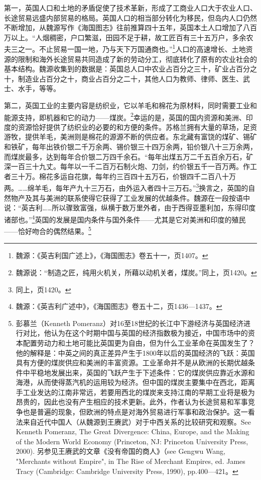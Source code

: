 \documentclass[a4paper, 12pt, openright]{ctexbook}
\begin{document}
第一，英国人口和土地的矛盾促使了技术革新，形成了工商业人口大于农业人口、长途贸易远盛内部贸易的格局。英国人口的相当部分转化为移民，但岛内人口仍然不断增加，从魏源写作《海国图志》往前推算四十五年，英国本土人口增加了八百万以上。“人烟稠密，户口繁滋，田园不足于耕，故工匠百有三十五万户，多余农夫三之一。不止贸易一国一地，乃与天下万国通商也。”\footnote{魏源：《英吉利国广述上》，《海国图志》卷五十一，页1407。}人口的高速增长、土地资源的限制和海外长途贸易共同造成了新的劳动分工，彻底转化了原有的农业社会的基本结构。魏源收集到的数据是：英国总人口中农业占百分之三十，矿业占百分之十，制造业占百分之十，商业占百分之二十，其他人口为教师、律师、医生、武士、水手，等等。

第二，英国工业的主要内容是纺织业，它以羊毛和棉花为原材料，同时需要工业和能源支持，即机器和它的动力——煤炭。\footnote{魏源说：“制造之匠，纯用火机关，所藉以动机关者，煤炭。”同上，页1420。}幸运的是，英国的国内资源和美洲、印度的资源恰好提供了纺织业的必要的和方便的条件。苏格兰拥有大量的草场，足资游牧，提供羊毛，美洲则是棉花的源源不断的供应者。东北藏有富饶的煤矿、锡矿和铁矿，每年出铁价银二千万余两、锡价银三十四万余两，铅价银八十三万余两，而煤炭最多，达到每年合价银二万四千余石。“每年出煤五万二千五百余万石，矿深一百三十九丈。每年以一千二百万石制火炮、刀剑，约价银五千一百万两。作工者三十万。棉花多运自花旗，每年约三百四十五万石，价银四千二百八十万两。……绵羊毛，每年产九十三万石，由外运入者四十三万石。”\footnote{同上，页1420。}换言之，英国的自然物产及其与美洲的联系使得它获得了工业发展的优越条件。魏源在一段按语中说：“英吉利……所以骤致富强，纵横于数万里外者，由于西得亚墨利加，东得印度诸部也。”\footnote{魏源：《英吉利广述中》，《海国图志》卷五十二，页1436—1437。}英国的发展是国内条件与国外条件——尤其是它对美洲和印度的殖民——恰好吻合的偶然结果。\footnote{彭慕兰（Kenneth Pomeranz）对16至18世纪的长江中下游经济与英国经济进行对比，他认为在这个时期中国与英国的经济指数极为接近，中国市场中的资本配置劳动力和土地可能比英国更为自由，但为什么工业革命在英国发生了？他的解释是：中英之间的真正差异产生于1800年以后的英国经济的飞跃：英国具有方便的煤炭供应和美洲的丰富资源。工业革命并不是从欧洲的长期优越条件中平稳地发展出来，英国的飞跃产生于下述条件：它的煤炭供应靠近水源和海港，从而使得蒸汽机的运用较为经济。但中国的煤炭主要集中在西北，距离手工业发达的江南非常远，若要用西北的煤炭来支持江南的早期工业将是极为昂贵的，因此也没有产生相应的技术更新。此外，作者认为长途贸易和军事竞争也是普遍的现象，但欧洲的特点是对海外贸易进行军事和政治保护。这一看法来自近代中国人（从魏源到王赓武）对于中西关系的比较研究和观察。See Kenneth Pomeranz, The Great Divergence: China, Europe, and the Making of the Modern World Economy (Princeton, NJ: Princeton University Press, 2000). 另参见王赓武的文章《没有帝国的商人》（see Gengwu Wang, "Merchants without Empire", in The Rise of Merchant Empires, ed. James Tracy (Cambridge: Cambridge University Press, 1990), pp.400—421。}
\end{document}
